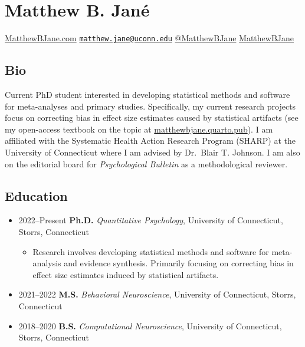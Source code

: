 \documentclass[
  letterpaper,
  DIV=11,
  numbers=noendperiod]{scrartcl}
\author{}
\date{}
\providecommand{\tightlist}{%
  \setlength{\itemsep}{0pt}\setlength{\parskip}{0pt}}\usepackage{longtable,booktabs,array}
\begin{document}
\ifdefined\Shaded\renewenvironment{Shaded}{\begin{tcolorbox}[frame hidden, boxrule=0pt, borderline west={3pt}{0pt}{shadecolor}, interior hidden, enhanced, sharp corners, breakable]}{\end{tcolorbox}}\fi

\hypertarget{matthew-b.-januxe9}{%
\section{Matthew B. Jané}\label{matthew-b.-januxe9}}

 \href{https://www.matthewbjane.com}{MatthewBJane.com}
\textbar{} 
\href{mailto:matthew.jane@uconn.edu}{\nolinkurl{matthew.jane@uconn.edu}}
\textbar{} 
\href{https://www.twitter.com/MatthewBJane}{@MatthewBJane} \textbar{}
 \href{https://www.github.io/MatthewBJane}{MatthewBJane}

\hypertarget{bio}{%
\subsection{\texorpdfstring{ Bio}{ Bio}}\label{bio}}

Current PhD student interested in developing statistical methods and
software for meta-analyses and primary studies. Specifically, my current
research projects focus on correcting bias in effect size estimates
caused by statistical artifacts (see my open-access textbook on the
topic at
\href{https://matthewbjane.quarto.pub}{matthewbjane.quarto.pub}). I am
affiliated with the Systematic Health Action Research Program (SHARP) at
the University of Connecticut where I am advised by Dr.~Blair T.
Johnson. I am also on the editorial board for \emph{Psychological
Bulletin} as a methodological reviewer.

\hypertarget{education}{%
\subsection{\texorpdfstring{ Education}{ Education}}\label{education}}

\begin{itemize}
\item
  2022--Present \textbar{} \textbf{Ph.D.} \emph{Quantitative
  Psychology}, University of Connecticut, Storrs, Connecticut

  \begin{itemize}
  \tightlist
  \item
    Research involves developing statistical methods and software for
    meta-analysis and evidence synthesis. Primarily focusing on
    correcting bias in effect size estimates induced by statistical
    artifacts.
  \end{itemize}
\item
  2021--2022 \textbar{} \textbf{M.S.} \emph{Behavioral Neuroscience},
  University of Connecticut, Storrs, Connecticut
\item
  2018--2020 \textbar{} \textbf{B.S.} \emph{Computational Neuroscience},
  University of Connecticut, Storrs, Connecticut
\end{itemize}
\end{document}
